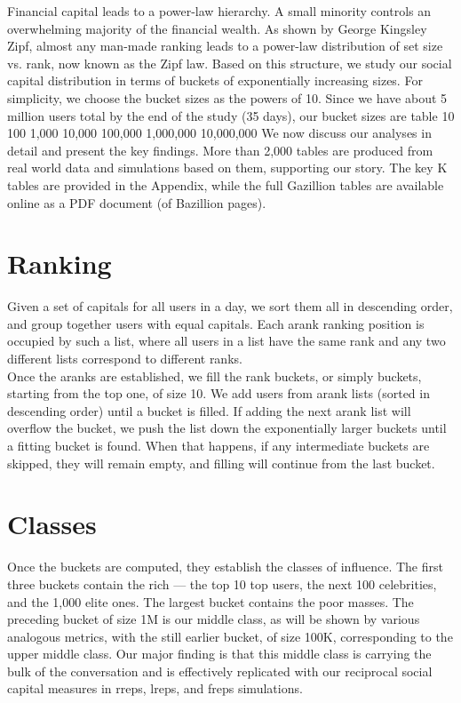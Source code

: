 \documentclass[10pt,oneside]{memoir}
\begin{document}
Financial capital leads to a power-law hierarchy.  A small minority controls an overwhelming majority of the financial wealth.  As shown by George Kingsley Zipf, almost any man-made ranking leads to a power-law distribution of set size vs. rank, now known as the Zipf law.  Based on this structure, we study our social capital distribution in terms of buckets of exponentially increasing sizes.
For simplicity, we choose the bucket sizes as the powers of 10.  Since we have about 5 million users total by the end of the study (35 days), our bucket sizes are
table
10 100 1,000 10,000 100,000 1,000,000 10,000,000
We now discuss our analyses in detail and present the key findings.  More than 2,000 tables are produced from real world data and simulations based on them, supporting our story.  The key K tables are provided in the Appendix, while the full Gazillion  tables are available online as a PDF document (of Bazillion pages).


\section{Ranking}
\label{ranking}

Given a set of capitals for all users in a day, we sort them all in descending order, and group together users with equal capitals.  Each arank ranking position is occupied by such a list, where all users in a list have the same rank and any two different lists correspond to different ranks. \\
Once the aranks are established, we fill the rank buckets, or simply buckets, starting from the top one, of size 10.  We add users from arank lists (sorted in descending order) until a bucket is filled.  If adding the next arank list will overflow the bucket, we push the list down the exponentially larger buckets until a fitting bucket is found.  When that happens, if any intermediate buckets are skipped, they will remain empty, and filling will continue from the last bucket.


\section{Classes}
\label{classes}

Once the buckets are computed, they establish the classes of influence.  The first three buckets contain the rich --- the top 10 top users, the next 100 celebrities, and the 1,000 elite ones.  The largest bucket contains the poor masses.  The preceding bucket of size 1M is our middle class, as will be shown by various analogous metrics, with the still earlier bucket, of size 100K, corresponding to the upper middle class. Our major finding is that this middle class is carrying the bulk of the conversation and is effectively replicated with our reciprocal social capital measures in rreps, lreps, and freps simulations.
\end{document}
